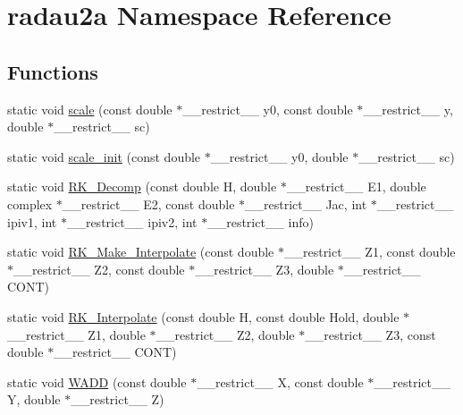 \hypertarget{namespaceradau2a}{}\section{radau2a Namespace Reference}
\label{namespaceradau2a}
\subsection*{Functions}
\begin{DoxyCompactItemize}
\item 
static void \hyperlink{namespaceradau2a_ad92aba1b979853cd2b6102916a402904}{scale} (const double $\ast$\+\_\+\+\_\+restrict\+\_\+\+\_\+ y0, const double $\ast$\+\_\+\+\_\+restrict\+\_\+\+\_\+ y, double $\ast$\+\_\+\+\_\+restrict\+\_\+\+\_\+ sc)
\item 
static void \hyperlink{namespaceradau2a_a093abea0d228c772d175be2927c5e80b}{scale\+\_\+init} (const double $\ast$\+\_\+\+\_\+restrict\+\_\+\+\_\+ y0, double $\ast$\+\_\+\+\_\+restrict\+\_\+\+\_\+ sc)
\item 
static void \hyperlink{namespaceradau2a_a3f1f64d323b61c19b47b8bd0670802bd}{R\+K\+\_\+\+Decomp} (const double H, double $\ast$\+\_\+\+\_\+restrict\+\_\+\+\_\+ E1, double complex $\ast$\+\_\+\+\_\+restrict\+\_\+\+\_\+ E2, const double $\ast$\+\_\+\+\_\+restrict\+\_\+\+\_\+ Jac, int $\ast$\+\_\+\+\_\+restrict\+\_\+\+\_\+ ipiv1, int $\ast$\+\_\+\+\_\+restrict\+\_\+\+\_\+ ipiv2, int $\ast$\+\_\+\+\_\+restrict\+\_\+\+\_\+ info)
\item 
static void \hyperlink{namespaceradau2a_a95409fe9e8a586b74e95cb084880daa5}{R\+K\+\_\+\+Make\+\_\+\+Interpolate} (const double $\ast$\+\_\+\+\_\+restrict\+\_\+\+\_\+ Z1, const double $\ast$\+\_\+\+\_\+restrict\+\_\+\+\_\+ Z2, const double $\ast$\+\_\+\+\_\+restrict\+\_\+\+\_\+ Z3, double $\ast$\+\_\+\+\_\+restrict\+\_\+\+\_\+ C\+O\+NT)
\item 
static void \hyperlink{namespaceradau2a_a5941fdd8c66eada16d6a0acaec4e1f78}{R\+K\+\_\+\+Interpolate} (const double H, const double Hold, double $\ast$\+\_\+\+\_\+restrict\+\_\+\+\_\+ Z1, double $\ast$\+\_\+\+\_\+restrict\+\_\+\+\_\+ Z2, double $\ast$\+\_\+\+\_\+restrict\+\_\+\+\_\+ Z3, const double $\ast$\+\_\+\+\_\+restrict\+\_\+\+\_\+ C\+O\+NT)
\item 
static void \hyperlink{namespaceradau2a_afbf6ff499a4ff97db4b27df63b6fbffd}{W\+A\+DD} (const double $\ast$\+\_\+\+\_\+restrict\+\_\+\+\_\+ X, const double $\ast$\+\_\+\+\_\+restrict\+\_\+\+\_\+ Y, double $\ast$\+\_\+\+\_\+restrict\+\_\+\+\_\+ Z)

\end{DoxyCompactItemize}
